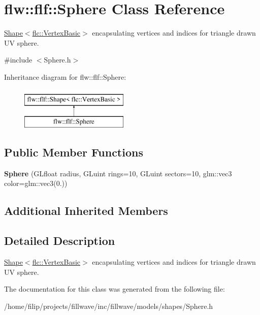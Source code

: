 \hypertarget{classflw_1_1flf_1_1Sphere}{}\section{flw\+:\+:flf\+:\+:Sphere Class Reference}
\label{classflw_1_1flf_1_1Sphere}


\hyperlink{classflw_1_1flf_1_1Shape}{Shape$<$flc\+::\+Vertex\+Basic$>$} encapsulating vertices and indices for triangle drawn UV sphere.  




{\ttfamily \#include $<$Sphere.\+h$>$}

Inheritance diagram for flw\+:\+:flf\+:\+:Sphere\+:\begin{figure}[H]
\begin{center}
\leavevmode
\includegraphics[height=2.000000cm]{classflw_1_1flf_1_1Sphere}
\end{center}
\end{figure}
\subsection*{Public Member Functions}
\begin{DoxyCompactItemize}
\item 
\mbox{\label{classflw_1_1flf_1_1Sphere_ac7c90f361a9b1aaf268c5372c8997fd6}} 
{\bfseries Sphere} (G\+Lfloat radius, G\+Luint rings=10, G\+Luint sectors=10, glm\+::vec3 color=glm\+::vec3(0.))
\end{DoxyCompactItemize}
\subsection*{Additional Inherited Members}


\subsection{Detailed Description}
\hyperlink{classflw_1_1flf_1_1Shape}{Shape$<$flc\+::\+Vertex\+Basic$>$} encapsulating vertices and indices for triangle drawn UV sphere. 

The documentation for this class was generated from the following file\+:\begin{DoxyCompactItemize}
\item 
/home/filip/projects/fillwave/inc/fillwave/models/shapes/Sphere.\+h\end{DoxyCompactItemize}

